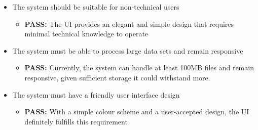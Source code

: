 \documentclass[12pt]{article}
\begin{document}
\begin{itemize}
      \item The system should be suitable for non-technical users
      \begin{itemize}
        \item \textbf{PASS:} The UI provides an elegant and simple design that requires minimal technical knowledge to operate
      \end{itemize}
      \item The system must be able to process large data sets and remain responsive
      \begin{itemize}
        \item \textbf{PASS:} Currently, the system can handle at least 100MB files and remain responsive, given sufficient storage it could withstand more.
      \end{itemize}
      \item The system must have a friendly user interface design
      \begin{itemize}
        \item \textbf{PASS:} With a simple colour scheme and a user-accepted design, the UI definitely fulfills this requirement
      \end{itemize}
\end{itemize}
\end{document}
